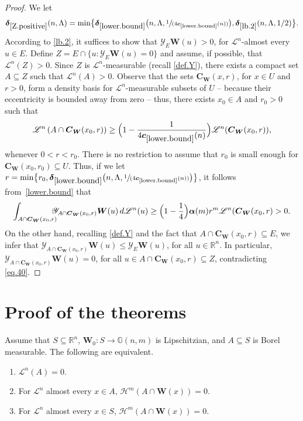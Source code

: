 \documentclass[JEP,XML,SOM,Unicode,ThmDefs,NoEqCountersInSection]{cedram}
\newcommand{\spfrac}[2]{\sfrac{#1}{(#2)}}
\newcommand{\R}{\mathbb{R}}
\newcommand{\Rn}{\R^n}
\newcommand{\calH}{\mathscr{H}}
\newcommand{\calL}{\mathscr{L}}
\newcommand{\calY}{\mathscr{Y}}
\newcommand{\balpha}{\boldsymbol{\alpha}}
\newcommand{\bdelta}{\boldsymbol{\delta}}
\newcommand{\bC}{{\boldsymbol{C}}}
\newcommand{\bW}{{\boldsymbol{W}}}
\newcommand{\bc}{{\boldsymbol{c}}}
\newcommand{\bG}{\mathbb{G}}
\let\subset\subseteq
\begin{document}
\begin{proof}
We let
\begin{equation*}
\bdelta_{\ref{Z.positive}}(n,\Lambda) = \min \bigl\{\bdelta_{\ref{lower.bound}}\bigl(n,\Lambda,\spfrac{1}{4\bc_{\ref{lower.bound}}(n)}\bigr), \bdelta_{\ref{lb.2}}(n,\Lambda,1/2) \bigr\}.
\end{equation*}
According to \ref{lb.2}, it suffices to show that $\calY_E \bW (u) > 0$, for $\calL^n$-almost every $u \in E$.
Define $Z = E \cap \{ u: \calY_E \bW(u) = 0 \}$ and assume, if possible, that $\calL^n(Z) > 0$.
Since $Z$ is $\calL^n$-measurable (recall \ref{def.Y}), there exists a compact set $A \subset Z$ such that $\calL^n(A) > 0$.
Observe that the sets $\bC_\bW(x,r)$, for $x \in U$ and $r > 0$, form a density basis for $\calL^n$-measurable subsets of $U$ -- because their eccentricity is bounded away from zero -- thus, there exists $x_0 \in A$ and $r_0 > 0$ such that
\begin{equation*}
\calL^n \left(A \cap \bC_\bW(x_0,r) \right) \geq \Bigl(1 - \frac{1}{4\bc_{\ref{lower.bound}}(n)} \Bigr) \calL^n(\bC_\bW(x_0,r)),
\end{equation*}
whenever $0 < r < r_0$.
There is no restriction to assume that $r_0$ is small enough for $\bC_\bW(x_0,r_0) \subset U$.
Thus, if we let $r= \min \bigl\{ r_0, \bdelta_{\ref{lower.bound}}\bigl(n,\Lambda,\spfrac{1}{4\bc_{\ref{lower.bound}}(n)}\bigr) \bigr\}$, it follows from~\ref{lower.bound} that
\begin{equation}
\label{eq.40}
\int_{A \cap \bC_\bW(x_0,r)}\hspace*{-3mm} \calY_{A \cap \bC_\bW(x_0,r)} \bW (u) \,d\calL^n(u) \geq \Bigl(1 - \frac{1}{4}\Bigr) \balpha(m)r^m\calL^n (\bC_\bW(x_0,r) > 0.
\end{equation}
On the other hand, recalling \ref{def.Y} and the fact that $A \cap \bC_\bW(x_0,r) \subset E$, we infer that $\calY_{A \cap \bC_\bW(x_0,r)} \bW(u) \leq \calY_E\bW(u)$, for all $u \in \Rn$.
In particular, $\calY_{A \cap \bC_\bW(x_0,r)} \bW(u)=0$, for all $u \in A \cap \bC_\bW(x_0,r) \subset Z$, contradicting \eqref{eq.40}.
\end{proof}

\section{Proof of the theorems}

\begin{theorem}
Assume that $S \subset \Rn$, $\bW_0: S \to \bG(n,m)$ is Lipschitzian, and $A \subset S$ is Borel measurable. The following are equivalent.
\begin{enumerate}
\item\label{enum:3.1} $\calL^n(A)=0$.
\item\label{enum:3.2} For $\calL^n$ almost every $x \in A$, $\calH^m(A \cap \bW(x))=0$.
\item\label{enum:3.3} For $\calL^n$ almost every $x \in S$, $\calH^m(A \cap \bW(x))=0$.
\end{enumerate}
\end{theorem}
\end{document}
